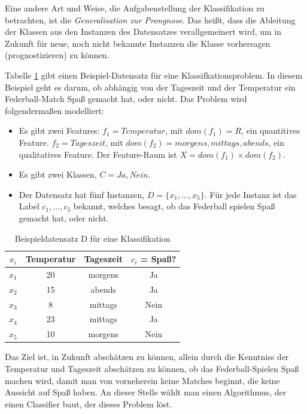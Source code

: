 Eine andere Art und Weise, die Aufgabenstellung der Klassifikation zu betrachten, ist die \emph{Generalisation zur Prongnose}. Das heißt, dass die Ableitung der Klassen aus den Instanzen des Datensatzes verallgemeinert wird, um in Zukunft für neue, noch nicht bekannte Instanzen die Klasse vorhersagen (prognostizieren) zu können. \cite[S. 6 - 7]{machine_marsland}

Tabelle \ref{tab:classfication_example} gibt einen Beispiel-Datensatz für eine Klassifkationsproblem. In diesem Beispiel geht es darum, ob abhängig von der Tageszeit und der Temperatur ein Federball-Match Spaß gemacht hat, oder nicht. Das Problem wird folgendermaßen modelliert:

\begin{itemize}
\item Es gibt zwei Features: $f_1 = Temperatur$, mit $dom(f_1) = R$, ein quantitives Feature. $f_2 = Tageszeit$, mit $dom(f_2) = {morgens, mittags, abends}$, ein qualitatives Feature. Der Feature-Raum ist $X = {dom(f_1) \times dom(f_2) }$.
\item Es gibt zwei Klassen, $C = {Ja, Nein}$.
\item Der Datensatz hat fünf Instanzen, $D = \{x_1, \ldots, x_5 \}$. Für jede Instanz ist das Label $c_1 , \ldots , c_5$ bekannt, welches besagt, ob das Federball spielen Spaß gemacht hat, oder nicht. 
\end{itemize}

\begin{table}[h]
	\centering
	\caption{Beispieldatensatz D für eine Klassifikation}
	\label{tab:classfication_example}
	\begin{tabular}{cccc}
		\toprule
		$x_i$      & Temperatur & Tageszeit & $c_i$ = Spaß? \\\midrule
		$x_1$  & 20                & morgens          & Ja           \\
		$x_2$  & 15                & abends           & Ja           \\
		$x_3$  & 8                 & mittags          & Nein         \\
		$x_4$  & 23                & mittags          & Ja           \\
		$x_5$  & 10                & morgens          & Nein       \\ \bottomrule 
	\end{tabular}
\end{table}

Das Ziel ist, in Zukunft abschätzen zu können, allein durch die Kenntniss der Temperatur und Tageszeit abschätzen zu können, ob das Federball-Spielen Spaß machen wird, damit man von vorneherein keine Matches beginnt, die keine Aussicht auf Spaß haben. An dieser Stelle wählt man einen Algorithmus, der einen Classifier baut, der dieses Problem löst. 

